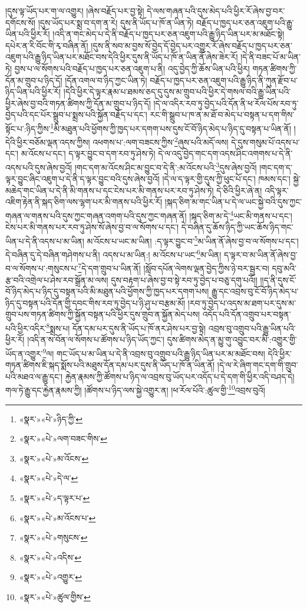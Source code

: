 །དུས་ལྟ་ཡོད་པར་ག་ལ་འགྱུར། །ཞེས་བརྗོད་པར་བྱ་སྟེ། དེ་ལས་གཞན་པའི་དུས་མེད་པའི་ཕྱིར་རོ་ཞེས་བྱ་བར་དགོངས་སོ། །དུས་ཡོད་པར་སྨྲ་བ་དག་ན་རེ། དུས་ནི་ཡོད་པ་ཁོ་ན་ཡིན་ཏེ། བརྗོད་པ་ཁྱད་པར་ཅན་འཇུག་པའི་རྒྱུ་ཡིན་པའི་ཕྱིར་རོ། །འདི་ན་གང་མེད་པ་དེ་ནི་བརྗོད་པ་ཁྱད་པར་ཅན་འཇུག་པའི་རྒྱུ་ཉིད་ཡིན་པར་མ་མཐོང་སྟེ། དཔེར་ན་རི་བོང་གི་རྭ་བཞིན་ནོ། །དུས་ནི་སབ་མ་བྱས་སོ་བྱེད་དོ་བྱེད་པར་འགྱུར་རོ་ཞེས་བརྗོད་པ་ཁྱད་པར་ཅན་འཇུག་པའི་རྒྱུ་ཉིད་ཡིན་པར་མཐོང་བས་དེའི་ཕྱིར་དུས་ནི་ཡོད་པ་ཁོ་ན་ཡིན་ནོ་ཞེས་ཟེར་རོ། །དེ་ནི་བཟང་པོ་མ་ཡིན་ཏེ། བྱས་པ་ལ་སོགས་པའི་བརྗོད་པ་ཁྱད་པར་ཅན་འཇུག་པ་ནི། འདུ་བྱེད་ཀྱི་ཆོས་ཡིན་པའི་ཕྱིར། གཏན་ཚིགས་ཀྱི་དོན་མ་གྲུབ་པ་ཉིད་དོ། །དོན་འགལ་བ་ཉིད་ཀྱང་ཡིན་ཏེ། བརྗོད་པ་ཁྱད་པར་ཅན་འཇུག་པའི་རྒྱུ་ཉིད་ནི་ཀུན་རྫོབ་པ་ཉིད་ཡིན་པའི་ཕྱིར་རོ། །དེའི་ཕྱིར་དེ་ལྟར་རྣམ་པ་ཐམས་ཅད་དུ་དུས་མ་གྲུབ་པའི་ཕྱིར་དེ་གསལ་བའི་རྒྱུ་ཡིན་པའི་ཕྱིར་ཞེས་བྱ་བའི་གཏན་ཚིགས་ཀྱི་དོན་མ་གྲུབ་པ་ཉིད་དོ། །དེ་ལ་འདིར་རབ་ཏུ་བྱེད་པའི་དོན་ནི་ཕ་རོལ་པོས་རབ་ཏུ་བྱེད་པའི་དང་པོར་སྒྲུབ་པ་སྨྲས་པའི་སྐྱོན་བརྗོད་པ་དང་། རང་གི་སྒྲུབ་པ་ཁ་ན་མ་ཐོ་བ་མེད་པ་བསྟན་པ་དག་གིས་སྟོང་པ་:ཉིད་ཀྱིས་\footnote{«སྣར་»«པེ་»ཉིད་ཀྱི་}མི་མཐུན་པའི་ཕྱོགས་ཀྱི་ཁྱད་པར་དགག་པས་དུས་ངོ་བོ་ཉིད་མེད་པ་ཉིད་དུ་བསྟན་པ་ཡིན་ནོ། །དེའི་ཕྱིར་བཅོམ་ལྡན་འདས་ཀྱིས། འཕགས་པ་:ལག་བཟངས་ཀྱིས་\footnote{«སྣར་»«པེ་»ལག་བཟང་གིས་}ཞུས་པའི་མདོ་ལས། དེ་དུས་གསུམ་པོ་འདས་པ་དང་། མ་འོངས་པ་དང་། ད་ལྟར་བྱུང་བ་དག་རབ་ཏུ་ཤེས་ཏེ། དེ་ལ་འདུ་བྱེད་གང་དག་འདས་ཤིང་འགགས་པ་དེ་ནི་འདས་པའི་དུས་ཞེས་བྱའོ། །གང་དག་མ་འོངས་ཤིང་མ་བྱུང་བ་དེ་ནི་:མ་འོངས་པའི་\footnote{«སྣར་»«པེ་»མ་འོངས་}དུས་ཞེས་བྱའོ། །གང་དག་ད་ལྟར་བྱུང་ཞིང་འཇུག་པ་དེ་ནི་ད་ལྟར་བྱུང་བའི་དུས་ཞེས་བྱའོ། །དེ་ལ་ད་ལྟར་གྱི་དུས་ཀྱི་ཕུང་པོ་དང་། ཁམས་དང་། སྐྱེ་མཆེད་གང་ཡིན་པ་དེ་ནི་མི་གནས་པ་དང་ངེས་པར་མི་གནས་པར་རབ་ཏུ་ཤེས་ཏེ། དེ་ཅིའི་ཕྱིར་ཞེ་ན། འདི་ལྟར་འཇིག་རྟེན་ནི་སྐད་ཅིག་ལས་ལྷག་པར་མི་གནས་པའི་ཕྱིར་རོ། །སྐད་ཅིག་མ་གང་ཡིན་པ་དེ་ལ་ཡང་སྐྱེ་བའི་དུས་ཀྱང་གཞན་ལ་གནས་པའི་དུས་ཀྱང་གཞན་འགག་པའི་དུས་ཀྱང་གཞན་ནོ། །སྐད་ཅིག་མ་དེ་\footnote{«སྣར་»«པེ་»དེ་ལ་}ཡང་མི་གནས་པ་དང་། ངེས་པར་མི་གནས་པར་རབ་ཏུ་ཤེས་སོ་ཞེས་བྱ་བ་ལ་སོགས་པ་དང་། དེ་བཞིན་དུ་ཆོས་ཉིད་ཀྱི་ཡང་ཆོས་ཉིད་གང་ཡིན་པ་དེ་ནི་འདས་པ་མ་ཡིན། མ་འོངས་པ་ཡང་མ་ཡིན། :ད་ལྟར་བྱུང་བ་\footnote{«སྣར་»«པེ་»ད་ལྟར་པ་}མ་ཡིན་ནོ་ཞེས་བྱ་བ་ལ་སོགས་པ་དང་། དེ་བཞིན་དུ་དེ་བཞིན་གཤེགས་པ་ནི། འདས་པ་མ་ཡིན:། མ་འོངས་པ་ཡང་\footnote{«སྣར་»«པེ་»མ་འོངས་པ་}མ་ཡིན། ད་ལྟར་བ་མ་ཡིན་ནོ་ཞེས་བྱ་བ་ལ་སོགས་པ་:གསུངས་པ་\footnote{«སྣར་»«པེ་»གསུངས་}དེ་དག་གྲུབ་པ་ཡིན་ནོ། །སློབ་དཔོན་ལེགས་ལྡན་བྱེད་ཀྱིས་ཉེ་བར་སྦྱར་བ། དབུ་མའི་རྩ་བའི་འགྲེལ་པ་ཤེས་རབ་སྒྲོན་མ་ལས། དུས་བརྟག་པ་ཞེས་བྱ་བ་སྟེ་རབ་ཏུ་བྱེད་པ་བཅུ་དགུ་པའོ།། །།ད་ནི་དུས་ངོ་བོ་ཉིད་མེད་པ་ཉིད་དུ་བསྟན་པའི་མི་མཐུན་པའི་ཕྱོགས་ཀྱི་ཁྱད་པར་དགག་པས། རྒྱུ་དང་འབྲས་བུ་ངོ་བོ་ཉིད་མེད་པ་ཉིད་དུ་བསྟན་པའི་དོན་གྱི་དབང་གིས་རབ་ཏུ་བྱེད་པ་ཉི་ཤུ་པ་བརྩམ་མོ། །རབ་ཏུ་བྱེད་པ་འདས་མ་ཐག་པར་དུས་མ་གྲུབ་པས་གཏན་ཚིགས་ཀྱི་སྐྱོན་བསྟན་པའི་ཕྱིར་དུས་གྲུབ་ན་སྐྱོན་མེད་པས། འདོད་པའི་དོན་འགྲུབ་པར་བསྟན་པའི་ཕྱིར་འདིར་\footnote{«སྣར་»«པེ་»འདིས་}སྨྲས་པ། དོན་དམ་པར་དུས་ནི་ཡོད་པ་ཁོ་ནར་ཤེས་པར་བྱ་སྟེ། འབྲས་བུ་འགྲུབ་པའི་རྒྱུ་ཡིན་པའི་ཕྱིར་རོ། །འདི་ན་ས་བོན་ལ་སོགས་པ་ཚོགས་པ་ཉིད་ཡོད་ཀྱང་། དུས་ཚིགས་མེད་ན་མྱུ་གུ་འབྱུང་བར་མི་:འགྱུར་གྱི་ཡོད་ན་འགྱུར་\footnote{«སྣར་»«པེ་»འགྱུར་}ལ། གང་ཡོད་པ་མ་ཡིན་པ་དེ་ནི་འབྲས་བུ་འགྲུབ་པའི་རྒྱུ་ཉིད་ཡིན་པར་མ་མཐོང་བས། དེའི་ཕྱིར་གཏན་ཚིགས་ཇི་སྐད་སྨོས་པའི་མཐུས་དོན་དམ་པར་དུས་ནི་ཡོད་པ་ཁོ་ན་ཡིན་ནོ། །དེ་ལ་རེ་ཞིག་གང་དག་གི་གྲུབ་པའི་མཐའ་ལ་རྒྱུ་དང་། རྐྱེན་རྣམས་ཀྱི་ཚོགས་པ་ཉིད་ལ་འབྲས་བུ་ཡོད་པར་འདོད་པ་དེ་དག་གི་ཕྱིར་འདི་བཤད་དེ། གལ་ཏེ་རྒྱུ་དང་རྐྱེན་རྣམས་ཀྱི། །ཚོགས་པ་ཉིད་ལས་སྐྱེ་འགྱུར་ན། །ཕ་རོལ་པོའི་:ཚུལ་གྱི་\footnote{«སྣར་»«པེ་»ཚུལ་གྱིས་}འབྲས་བུའོ། 